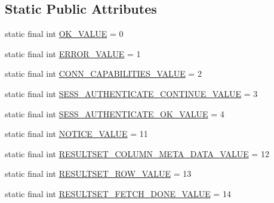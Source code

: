 \subsection*{Static Public Attributes}
\begin{DoxyCompactItemize}
\item 
static final int \mbox{\hyperlink{enumcom_1_1mysql_1_1cj_1_1x_1_1protobuf_1_1_mysqlx_1_1_server_messages_1_1_type_ae31a9004cf8d79d36ce9fd42a3eba522}{O\+K\+\_\+\+V\+A\+L\+UE}} = 0
\item 
static final int \mbox{\hyperlink{enumcom_1_1mysql_1_1cj_1_1x_1_1protobuf_1_1_mysqlx_1_1_server_messages_1_1_type_af542a5c79e27a5c1a7ebe126b5069b0e}{E\+R\+R\+O\+R\+\_\+\+V\+A\+L\+UE}} = 1
\item 
static final int \mbox{\hyperlink{enumcom_1_1mysql_1_1cj_1_1x_1_1protobuf_1_1_mysqlx_1_1_server_messages_1_1_type_aecf6dbf18f9aef147a3990cc628769be}{C\+O\+N\+N\+\_\+\+C\+A\+P\+A\+B\+I\+L\+I\+T\+I\+E\+S\+\_\+\+V\+A\+L\+UE}} = 2
\item 
static final int \mbox{\hyperlink{enumcom_1_1mysql_1_1cj_1_1x_1_1protobuf_1_1_mysqlx_1_1_server_messages_1_1_type_aea2571cc3774299e46163ff198b81ed4}{S\+E\+S\+S\+\_\+\+A\+U\+T\+H\+E\+N\+T\+I\+C\+A\+T\+E\+\_\+\+C\+O\+N\+T\+I\+N\+U\+E\+\_\+\+V\+A\+L\+UE}} = 3
\item 
static final int \mbox{\hyperlink{enumcom_1_1mysql_1_1cj_1_1x_1_1protobuf_1_1_mysqlx_1_1_server_messages_1_1_type_ac382e359780b9a0a2ca6095afd3a5fdb}{S\+E\+S\+S\+\_\+\+A\+U\+T\+H\+E\+N\+T\+I\+C\+A\+T\+E\+\_\+\+O\+K\+\_\+\+V\+A\+L\+UE}} = 4
\item 
static final int \mbox{\hyperlink{enumcom_1_1mysql_1_1cj_1_1x_1_1protobuf_1_1_mysqlx_1_1_server_messages_1_1_type_a0f8fb78aa18c6760e2d842fa8e45e997}{N\+O\+T\+I\+C\+E\+\_\+\+V\+A\+L\+UE}} = 11
\item 
static final int \mbox{\hyperlink{enumcom_1_1mysql_1_1cj_1_1x_1_1protobuf_1_1_mysqlx_1_1_server_messages_1_1_type_a53bc941135783404393ad36b508668c5}{R\+E\+S\+U\+L\+T\+S\+E\+T\+\_\+\+C\+O\+L\+U\+M\+N\+\_\+\+M\+E\+T\+A\+\_\+\+D\+A\+T\+A\+\_\+\+V\+A\+L\+UE}} = 12
\item 
static final int \mbox{\hyperlink{enumcom_1_1mysql_1_1cj_1_1x_1_1protobuf_1_1_mysqlx_1_1_server_messages_1_1_type_aa4ad6a390f2f7dce43041ba108a58a36}{R\+E\+S\+U\+L\+T\+S\+E\+T\+\_\+\+R\+O\+W\+\_\+\+V\+A\+L\+UE}} = 13
\item 
static final int \mbox{\hyperlink{enumcom_1_1mysql_1_1cj_1_1x_1_1protobuf_1_1_mysqlx_1_1_server_messages_1_1_type_abeb0a1a11f52d0cb7a35a731a589ecb1}{R\+E\+S\+U\+L\+T\+S\+E\+T\+\_\+\+F\+E\+T\+C\+H\+\_\+\+D\+O\+N\+E\+\_\+\+V\+A\+L\+UE}} = 14

\end{DoxyCompactItemize}
